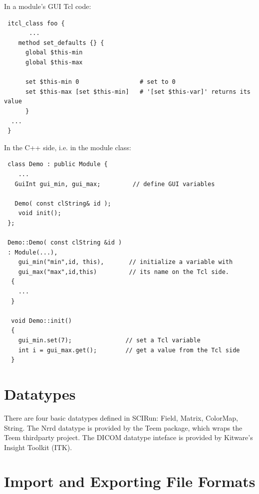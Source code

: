 \documentclass[fleqn,12pt,openany]{book}
\begin{document}
\noindent In a module's GUI Tcl code:

\begin{verbatim}
 itcl_class foo {
       ...
    method set_defaults {} {
      global $this-min
      global $this-max
      
      set $this-min 0                 # set to 0
      set $this-max [set $this-min]   # '[set $this-var]' returns its value
      }
  ...
 }
\end{verbatim}

\noindent In the C++ side, i.e. in the module class:

\begin{verbatim}
 class Demo : public Module {
    ...
   GuiInt gui_min, gui_max;         // define GUI variables
    
   Demo( const clString& id );
    void init();
 };
  
 Demo::Demo( const clString &id ) 
 : Module(...), 
    gui_min("min",id, this),       // initialize a variable with
    gui_max("max",id,this)         // its name on the Tcl side.
  {
    ...
  }
  
  void Demo::init() 
  {
    gui_min.set(7);               // set a Tcl variable
    int i = gui_max.get();        // get a value from the Tcl side
  }
\end{verbatim}

\chapter{Datatypes}

There are four basic datatypes defined in SCIRun: Field, Matrix, ColorMap, String.
The Nrrd datatype is provided by the Teem package, which wraps the Teem thirdparty project.
The DICOM datatype inteface is provided by Kitware's Insight Toolkit (ITK).



\chapter{Import and Exporting File Formats}
\end{document}
